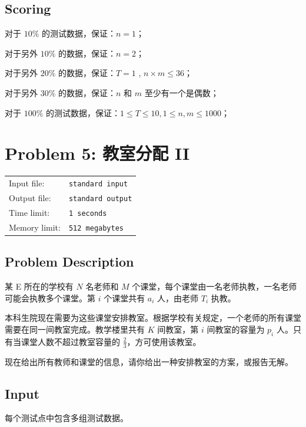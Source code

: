 \documentclass[12]{article}%
\begin{document}
\subsection*{\textsf{Scoring}}

\noindent 对于 $10\%$ 的测试数据，保证：$n = 1$；

\noindent 对于另外 $ 10\% $ 的数据，保证：$n = 2$；

\noindent 对于另外 $ 20\% $ 的数据，保证：$ T = 1 $ , $ n \times m \leq 36$；

\noindent 对于另外 $ 30\% $ 的数据，保证：$n$ 和 $m$ 至少有一个是偶数；

\noindent 对于 $100\%$ 的测试数据，保证：$ 1 \leq T \leq 10, 1 \leq n, m \leq 1000 $；


\newpage
\section*{\textsf{Problem 5: }\textrm{教室分配 II}}
\begin{tabular}{ll}
	\fontsize{10pt}{10pt} Input file: & \fontsize{10pt}{10pt}\texttt{standard input} \\
	\fontsize{10pt}{10pt} Output file: & \fontsize{10pt}{10pt}\texttt{standard output}\\
	\fontsize{10pt}{10pt} Time limit: & \fontsize{10pt}{10pt}\texttt{1 seconds} \\
	\fontsize{10pt}{10pt} Memory limit: & \fontsize{10pt}{10pt}\texttt{512 megabytes}\\
\end{tabular}
\subsection*{\textsf{Problem Description}}
某 E 所在的学校有 $N$ 名老师和 $M$ 个课堂，每个课堂由一名老师执教，一名老师可能会执教多个课堂。第 $i$ 个课堂共有 $a_i$ 人，由老师 $T_i$ 执教。

本科生院现在需要为这些课堂安排教室。根据学校有关规定，一个老师的所有课堂需要在同一间教室完成。教学楼里共有 $K$ 间教室，第 $i$ 间教室的容量为 $p_i$ 人。只有当课堂人数不超过教室容量的 $\frac{2}{3}$，方可使用该教室。

现在给出所有教师和课堂的信息，请你给出一种安排教室的方案，或报告无解。

\subsection*{\textsf{Input}}

\noindent 每个测试点中包含多组测试数据。
\end{document}
